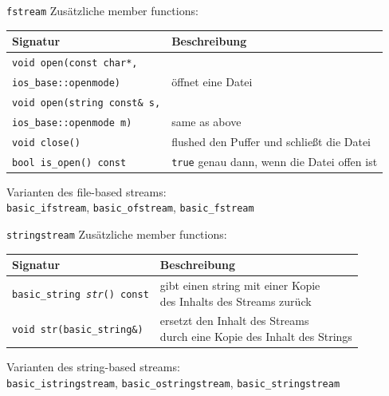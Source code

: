 \begin{frame}{\texttt{fstream}}
	Zusätzliche member functions:
	\vspace{1em}
	
	\footnotesize
	
	\begin{tabular}{ll}
		\textbf{Signatur}	&	\textbf{Beschreibung}	\\
		\hline
		\texttt{void open(const char*,}\\
			\hspace{2em} \texttt{ios\_base::openmode)}	&	öffnet eine Datei	\\
		\texttt{void open(string const\& s,}\\
			\hspace{2em} \texttt{ios\_base::openmode m)}	&	same as above	\\
		\texttt{void close()}	&	flushed den Puffer und schließt die Datei	\\
		\texttt{bool is\_open() const}	&	\texttt{true} genau dann, wenn die Datei offen ist	\\
	\end{tabular}
	
	\vspace{2em}
	
	Varianten des file-based streams:	\\
	\texttt{basic\_ifstream}, \texttt{basic\_ofstream}, \texttt{basic\_fstream}
\end{frame}

\begin{frame}{\texttt{stringstream}}
	Zusätzliche member functions:
	\vspace{1em}
	
	\footnotesize
	
	\begin{tabular}{ll}
		\textbf{Signatur}	&	\textbf{Beschreibung}	\\
		\hline
		\texttt{basic\_string \emph{str}() const}	&	\parbox{25em}{gibt einen string mit einer Kopie\\ des Inhalts des Streams zurück}	\\
		\texttt{void str(basic\_string\&)}	&	\parbox{25em}{ersetzt den Inhalt des Streams\\ durch eine Kopie des Inhalt des Strings}	\\
	\end{tabular}
	
	\vspace{2em}
	
	Varianten des string-based streams:	\\
	\texttt{basic\_istringstream}, \texttt{basic\_ostringstream}, \texttt{basic\_stringstream}
\end{frame}


